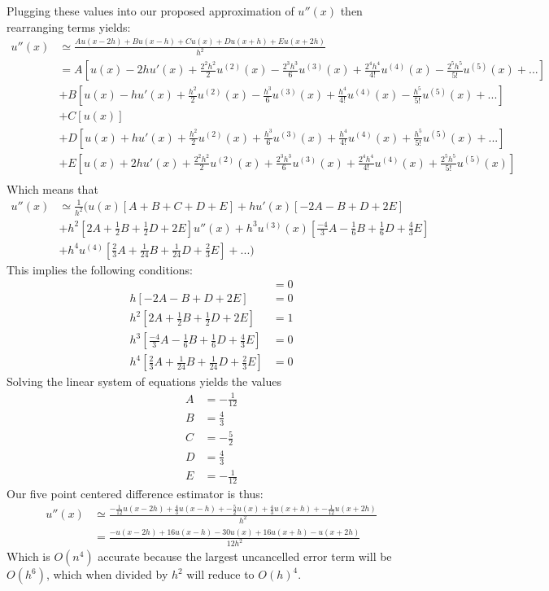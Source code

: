 \documentclass[11pt]{amsart}
\begin{document}
Plugging these values into our proposed approximation of $u''(x)$ then rearranging terms yields:
\begin{align*}
u''(x) &\simeq \frac{Au(x-2h) + Bu(x-h) + Cu(x) + Du(x+h) + Eu(x+2h)}{h^2}\\
&= A[u(x)-2hu'(x)+\frac{2^2h^2}{2}u^{(2)}(x)-\frac{2^3h^3}{6}u^{(3)}(x) + \frac{2^4h^4}{4!}u^{(4)}(x) - \frac{2^5h^5}{5!}u^{(5)}(x)+...]\\
&+B[u(x)-hu'(x)+\frac{h^2}{2}u^{(2)}(x)-\frac{h^3}{6}u^{(3)}(x) + \frac{h^4}{4!}u^{(4)}(x) - \frac{h^5}{5!}u^{(5)}(x)+...]\\
&+C[u(x)]\\
&+D[u(x)+hu'(x)+\frac{h^2}{2}u^{(2)}(x)+\frac{h^3}{6}u^{(3)}(x) + \frac{h^4}{4!}u^{(4)}(x) + \frac{h^5}{5!}u^{(5)}(x)+...]\\
&+E[u(x)+2hu'(x)+\frac{2^2h^2}{2}u^{(2)}(x)+\frac{2^3h^3}{6}u^{(3)}(x) + \frac{2^4h^4}{4!}u^{(4)}(x) + \frac{2^5h^5}{5!}u^{(5)}(x)]\\
\end{align*}
Which means that 
\begin{align*}
u''(x) &\simeq \frac{1}{h^2}(u(x)[A+B+C+D+E]  + hu'(x)[-2A -B + D + 2E]  \\ 
&+ h^2[2A + \frac{1}{2}B + \frac{1}{2}D + 2E]u''(x)  + h^3u^{(3)}(x)[\frac{-4}{3}A - \frac{1}{6}B + \frac{1}{6}D + \frac{4}{3}E]\\
&+ h^4u^{(4)}[\frac{2}{3}A + \frac{1}{24}B + \frac{1}{24}D + \frac{2}{3}E]+...)
\end{align*}
This implies the following conditions:
\begin{align*}
[A+B+C+D+E] &= 0\\
h[-2A -B + D + 2E]  &=0\\ 
h^2[2A + \frac{1}{2}B + \frac{1}{2}D + 2E] &=1\\
h^3[\frac{-4}{3}A - \frac{1}{6}B + \frac{1}{6}D + \frac{4}{3}E] &= 0\\
h^4[\frac{2}{3}A + \frac{1}{24}B + \frac{1}{24}D + \frac{2}{3}E] &= 0
\end{align*}
Solving the linear system of equations yields the values
\begin{align*}
A &= -\frac{1}{12}\\
B &= \frac{4}{3}\\
C &= -\frac{5}{2}\\
D &= \frac{4}{3}\\
E &= -\frac{1}{12}
\end{align*}
Our five point centered difference estimator is thus:
\begin{align*}
u''(x) & \simeq \frac{-\frac{1}{12}u(x-2h) +  \frac{4}{3}u(x-h) + -\frac{5}{2}u(x) + \frac{4}{3}u(x+h) + -\frac{1}{12}u(x+2h)}{h^2}\\
& = \frac{-u(x-2h) +  16u(x-h) -30u(x) + 16u(x+h) -u(x+2h)}{12h^2}
\end{align*}
Which is $O(n^4)$ accurate because the largest uncancelled error term will be $O(h^6)$, which when divided by $h^2$ will reduce to $O(h)^4$.
\end{document}
